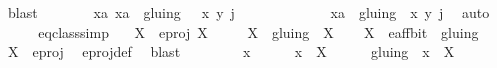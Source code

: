 \begin{isabellebody}
\ blast\isacommand{{\isacharbraceright}}\isamarkupfalse%
\isanewline
\ \ \ \ \isamarkupfalse%
\ \isamarkupfalse%
\ {\isachardoublequoteopen}{\isasymAnd}xa{\isachardot}\ xa\ {\isasymin}\ gluing\ {\isacharbackquote}{\isacharbackquote}\ {\isacharbraceleft}{\isacharparenleft}{\isasymtau}\ {\isacharparenleft}x{\isacharcomma}\ y{\isacharparenright}{\isacharcomma}\ j\ {\isacharplus}\ {}{\isacharparenright}{\isacharbraceright}\ {\isasymLongrightarrow}\isanewline
\ \ \ \ \ \ \ \ \ \ xa\ {\isasymin}\ gluing\ {\isacharbackquote}{\isacharbackquote}\ {\isacharbraceleft}{\isacharparenleft}{\isacharparenleft}x{\isacharcomma}\ y{\isacharparenright}{\isacharcomma}\ j{\isacharparenright}{\isacharbraceright}{\isachardoublequoteclose}\ \isamarkupfalse%
\ auto\isanewline
\ \ \isamarkupfalse%
\isanewline
{}\isamarkupfalse%
%
\endisatagproof
{\isafoldproof}%
%
\isadelimproof
\ \isanewline
%
\endisadelimproof
\isanewline
\isanewline
\isanewline
{}\isamarkupfalse%
\ eq{\isacharunderscore}class{\isacharunderscore}simp{\isacharcolon}\isanewline
\ \ \ {\isachardoublequoteopen}X\ {\isasymin}\ e{\isacharunderscore}proj{\isachardoublequoteclose}\ {\isachardoublequoteopen}X\ {\isasymnoteq}\ {\isacharbraceleft}{\isacharbraceright}{\isachardoublequoteclose}\isanewline
\ \ \ {\isachardoublequoteopen}X\ {\isacharslash}{\isacharslash}\ gluing\ {\isacharequal}\ {\isacharbraceleft}X{\isacharbraceright}{\isachardoublequoteclose}\isanewline
%
\isadelimproof
%
\endisadelimproof
%
\isatagproof
{}\isamarkupfalse%
\isanewline
\ \ \isamarkupfalse%
\ {\isachardoublequoteopen}X\ {\isasymin}\ e{\isacharunderscore}aff{\isacharunderscore}bit\ {\isacharslash}{\isacharslash}\ gluing{\isachardoublequoteclose}\ \isamarkupfalse%
\ {\isacartoucheopen}X\ {\isasymin}\ e{\isacharunderscore}proj{\isacartoucheclose}\ \isamarkupfalse%
\ e{\isacharunderscore}proj{\isacharunderscore}def\ \isamarkupfalse%
\ blast\isanewline
\isanewline
\ \ \isacommand{{\isacharbraceleft}}\isamarkupfalse%
\isanewline
\ \ \ \ \isamarkupfalse%
\ x\isanewline
\ \ \ \ \isamarkupfalse%
\ {\isachardoublequoteopen}x\ {\isasymin}\ X{\isachardoublequoteclose}\isanewline
\ \ \ \ \isamarkupfalse%
\ {\isachardoublequoteopen}gluing\ {\isacharbackquote}{\isacharbackquote}\ {\isacharbraceleft}x{\isacharbraceright}\ {\isacharequal}\ X{\isachardoublequoteclose}\isanewline
\ \ \ \ \ \isamarkupfalse%

\end{isabellebody}
